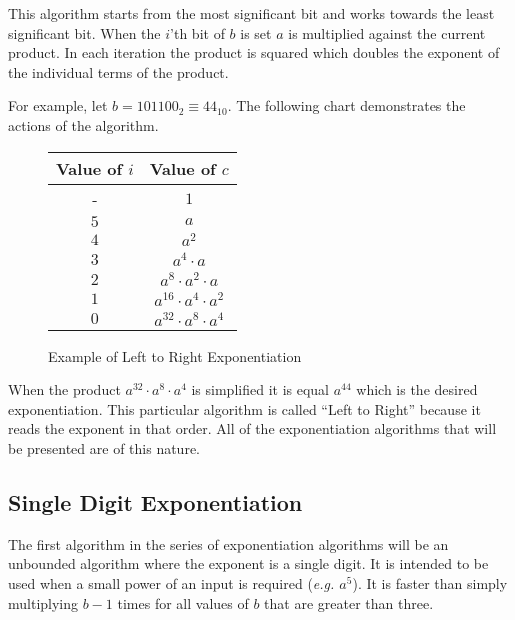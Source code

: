 \documentclass[b5paper]{book}
\begin{document}
This algorithm starts from the most significant bit and works towards the least significant bit.  When the $i$'th bit of $b$ is set $a$ is
multiplied against the current product.  In each iteration the product is squared which doubles the exponent of the individual terms of the
product.  

For example, let $b = 101100_2 \equiv 44_{10}$.  The following chart demonstrates the actions of the algorithm.

\newpage\begin{figure}
\begin{center}
\begin{tabular}{|c|c|}
\hline \textbf{Value of $i$} & \textbf{Value of $c$} \\
\hline - & $1$ \\
\hline $5$ & $a$ \\
\hline $4$ & $a^2$ \\
\hline $3$ & $a^4 \cdot a$ \\
\hline $2$ & $a^8 \cdot a^2 \cdot a$ \\
\hline $1$ & $a^{16} \cdot a^4 \cdot a^2$ \\
\hline $0$ & $a^{32} \cdot a^8 \cdot a^4$ \\
\hline
\end{tabular}
\end{center}
\caption{Example of Left to Right Exponentiation}
\end{figure}

When the product $a^{32} \cdot a^8 \cdot a^4$ is simplified it is equal $a^{44}$ which is the desired exponentiation.  This particular algorithm is 
called ``Left to Right'' because it reads the exponent in that order.  All of the exponentiation algorithms that will be presented are of this nature.  

\subsection{Single Digit Exponentiation}
The first algorithm in the series of exponentiation algorithms will be an unbounded algorithm where the exponent is a single digit.  It is intended 
to be used when a small power of an input is required (\textit{e.g. $a^5$}).  It is faster than simply multiplying $b - 1$ times for all values of 
$b$ that are greater than three.  
\end{document}
